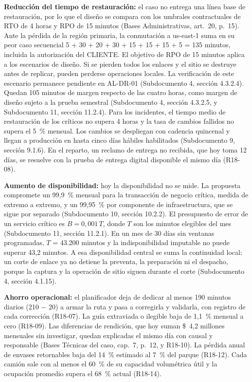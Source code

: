 \textbf{Reducción del tiempo de restauración:} el caso no entrega una línea base de restauración, por lo que el diseño se compara con los umbrales contractuales de RTO de 4 horas y RPO de 15 minutos (Bases Administrativas, art.~20, p.~15). Ante la pérdida de la región primaria, la conmutación a us-east-1 suma en su peor caso secuencial 5 + 30 + 20 + 30 + 15 + 15 + 15 + 5 = 135 minutos, incluida la autorización del CLIENTE. El objetivo de RPO de 15 minutos aplica a los escenarios de diseño. Si se pierden todos los enlaces y el sitio se destruye antes de replicar, pueden perderse operaciones locales. La verificación de este escenario permanece pendiente en AL-DR-01 (Subdocumento 4, sección 4.3.2.4). Quedan 105 minutos de margen respecto de las cuatro horas, como margen de diseño sujeto a la prueba semestral (Subdocumento 4, sección 4.3.2.5, y Subdocumento 11, sección 11.2.4). Para los incidentes, el tiempo medio de restauración de los críticos no supera 4 horas y la tasa de cambios fallidos no supera el 5~\% mensual. Los cambios se despliegan con cadencia quincenal y llegan a producción en hasta cinco días hábiles habilitados (Subdocumento 9, sección 9.1.6). En el reparto, un reclamo de entrega no recibida, que hoy toma 12 días, se resuelve con la prueba de entrega digital disponible el mismo día (R18-08).

\textbf{Aumento de disponibilidad:} hoy la disponibilidad no se mide. La propuesta compromete un 99,9~\% mensual para la transacción de negocio crítica, medida de extremo a extremo, y un 99,95~\% por componente de infraestructura, que se sigue por separado (Subdocumento 10, sección 10.2.2). El presupuesto de error de un servicio crítico es $B = 0{,}001\,T$, donde $T$ son los minutos elegibles del mes (Subdocumento 11, sección 11.2.1). En un mes de 30 días sin ventanas programadas, $T$ = 43.200 minutos y la indisponibilidad imputable no puede superar 43,2 minutos. A esa disponibilidad central se suma la continuidad local: un corte de enlace ya no detiene la preventa, la preparación ni el despacho, porque la captura y la operación de sitio siguen durante el corte (Subdocumento 4, sección 4.1.15).

\textbf{Ahorro operacional:} el planificador deja de dedicar al menos 190 minutos diarios (210 $-$ 20) a armar la ruta y pasa a corregirla y validarla, con registro de cada corrección (R18-07). La guía extraviada o ilegible baja de 1,1~\% mensual a cero (R18-09). Las diferencias de rendición, que hoy suman \$~4,2 millones mensuales sin investigar, quedan explicadas el mismo día con causal y responsable (Bases Técnicas del caso, cap.~7, p.~12, y R18-10). La pérdida anual de envases retornables baja del 14~\% estimado al 7~\% del parque (R18-12). Cada camión sale con al menos el 60~\% de su capacidad volumétrica útil y la ocupación promedio supera el 68~\% actual (R18-14).

